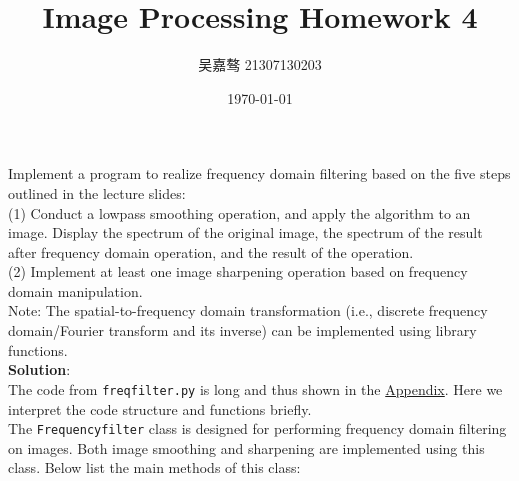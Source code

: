 \documentclass[UTF8]{ctexart}
\title{\textbf{Image Processing Homework 4}}
\author{吴嘉骜 21307130203}
\date{\today}
\begin{document}
\maketitle

\noindent
\section{}
\setlength{\parindent}{0pt}
Implement a program to realize frequency domain filtering based on the five steps outlined in the lecture slides:\\
(1) Conduct a lowpass smoothing operation, and apply the algorithm to an image.
Display the spectrum of the original image, the spectrum of the result after frequency domain operation, and the result of the operation.\\
(2) Implement at least one image sharpening operation based on frequency domain manipulation.\\
Note: The spatial-to-frequency domain transformation (i.e., discrete frequency domain/Fourier transform and its inverse) can be implemented using library functions.\\
\textbf{Solution}:\\
The code from \texttt{freqfilter.py} is long and thus shown in the \hyperlink{code1}{Appendix}. Here we interpret the code structure and functions briefly.\\
The \texttt{Frequencyfilter} class is designed for performing frequency domain filtering on images. Both image smoothing and sharpening are implemented using this class. 
Below list the main methods of this class:
\end{document}
